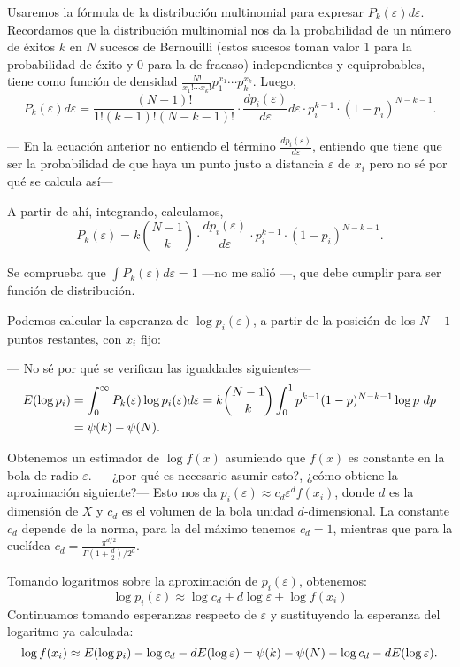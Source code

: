 \documentclass[10pt,a4paper]{article} %
\let\mathbb\relax
\theoremstyle{definition}
\begin{document}
Usaremos la fórmula de la distribución multinomial para expresar $P_k(\varepsilon)d\varepsilon$. Recordamos que la distribución multinomial nos da la probabilidad de un número de éxitos $k$ en $N$ sucesos de Bernouilli (estos sucesos toman valor 1 para la probabilidad de éxito  y 0 para la de fracaso) independientes y equiprobables, tiene como función de densidad $\frac{N!}{x_1!\cdots x_k!}p_1^{x_1}\cdots p_k^{x_k}$. Luego,\[
P_k(\varepsilon)d\varepsilon = \frac{(N-1)!}{1!(k-1)!(N-k-1)!} \cdot \frac{d p_i(\varepsilon)}{d\varepsilon} d\varepsilon \cdot p_i^{k-1} \cdot (1-p_i)^{N-k-1}.
\]

--- En la ecuación anterior no entiendo el término $ \frac{d p_i(\varepsilon)}{d\varepsilon} $, entiendo que tiene que ser la probabilidad de que haya un punto justo a distancia $\varepsilon$ de $x_i$ pero no sé por qué se calcula así---

A partir de ahí, integrando, calculamos,\[
P_k(\varepsilon) = k\binom{N-1}{k}
\cdot \frac{d p_i(\varepsilon)}{d\varepsilon} \cdot p_i^{k-1} \cdot (1-p_i)^{N-k-1}.
\]

Se comprueba que $\int P_k(\varepsilon)d\varepsilon = 1$ ---no me salió ---, que debe cumplir para ser función de distribución.

Podemos calcular la esperanza de $\log p_i (\varepsilon)$, a partir de la posición de los $N-1$ puntos restantes, con $x_i$ fijo:

--- No sé por qué se verifican las igualdades siguientes---
\begin{align*}
\mathbb{E}(\log p_i) &= \int_0^\infty P_k(\varepsilon) \log p_i(\varepsilon) d\varepsilon =  k\binom{N-1}{k} \int_0^1 p^{k-1}(1-p)^{N-k-1}\log p\ dp\\ &= \psi (k) - \psi(N).
\end{align*}

Obtenemos un estimador de $\log f(x)$ asumiendo que $f(x)$ es constante en la bola de radio $\varepsilon$. --- ¿por qué es necesario asumir esto?, ¿cómo obtiene la aproximación siguiente?--- Esto nos da $p_i (\varepsilon) \approx c_d \varepsilon^d f(x_i)$, donde $d$ es la dimensión de $X$ y $c_d$ es el volumen de la bola unidad $d$-dimensional. La constante $c_d$ depende de la norma, para la del máximo tenemos $c_d=1$, mientras que para la euclídea $c_d=\frac{\pi^{d/2}}{\Gamma\left ( 1+ \frac{d}{2} \right ) / 2^d}$.

Tomando logaritmos sobre la aproximación de $p_i(\varepsilon)$, obtenemos:\[
\log p_i(\varepsilon) \approx \log c_d + d \log \varepsilon + \log f(x_i)
\]
Continuamos tomando esperanzas respecto de $\varepsilon$ y sustituyendo la esperanza del logaritmo ya calculada:\[
\log f(x_i) \approx \mathbb{E}(\log p_i) - \log c_d  - d \mathbb{E} (\log \varepsilon) = \psi (k) - \psi (N) - \log c_d  - d \mathbb{E} (\log \varepsilon).
\]
\end{document}
